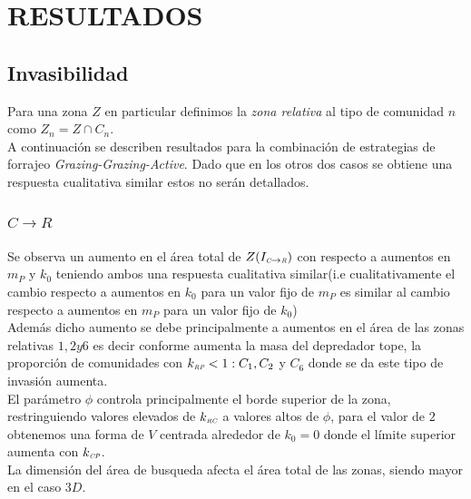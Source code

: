 \section{RESULTADOS}

\subsection{Invasibilidad}

Para una zona $Z$ en particular definimos la \emph{zona relativa} al tipo de comunidad $n$ como $Z_n = Z \cap C_n$. \\
A continuaci\'on se describen resultados para la combinaci\'on de estrategias de forrajeo \emph{Grazing-Grazing-Active}. Dado que en los otros dos casos se obtiene una respuesta cualitativa similar estos no ser\'an detallados.

\subsubsection{$ C \to R$}
Se observa un aumento en el \'area total de $Z(I_{\textit{\tiny C} \to \textit{\tiny R}})$ con respecto a aumentos en $m_P$ y $k_0$ teniendo ambos una respuesta cualitativa similar(i.e cualitativamente el cambio respecto a aumentos en $k_0$ para un valor fijo de $m_P$ es similar al cambio respecto a aumentos en $m_P$ para un valor fijo de $k_0$)\\
Adem\'as dicho aumento se debe principalmente a aumentos en el \'area de las zonas relativas $1 , 2 y 6$ es decir conforme aumenta la masa del depredador tope, la proporci\'on de comunidades con $k_{\textit{\tiny RP}} <1 : C_1,C_2$ y $C_6$ donde se da este tipo de invasi\'on aumenta.\\ 
El par\'ametro $\phi$ controla principalmente el borde superior de la zona, restringuiendo valores elevados de $k_{\textit{\tiny RC}}$ a valores altos de $\phi$, para el valor de $2$ obtenemos una forma de $V$ centrada alrededor de $k_0 = 0$ donde el l\'imite superior aumenta con $k_{\textit{\tiny CP}}$.\\
La dimensi\'on del \'area de busqueda afecta el \'area total de las zonas, siendo mayor en el caso $3D$. 

